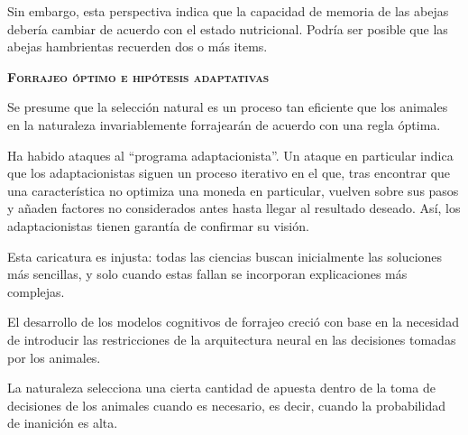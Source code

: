 \documentclass[a4paper,12pt]{article}
\begin{document}
Sin embargo, esta perspectiva indica que la capacidad de memoria de las abejas debería cambiar de acuerdo con el estado nutricional. Podría ser posible que las abejas hambrientas recuerden dos o más items.

{\scshape\bfseries Forrajeo óptimo e hipótesis adaptativas}

Se presume que la selección natural es un proceso tan eficiente que los animales en la naturaleza invariablemente forrajearán de acuerdo con una regla óptima.

Ha habido ataques al ``programa adaptacionista''. Un ataque en particular indica que los adaptacionistas siguen un proceso iterativo en el que, tras encontrar que una característica no optimiza una moneda en particular, vuelven sobre sus pasos y añaden factores no considerados antes hasta llegar al resultado deseado. Así, los adaptacionistas tienen garantía de confirmar su visión.

Esta caricatura es injusta: todas las ciencias buscan inicialmente las soluciones más sencillas, y solo cuando estas fallan se incorporan explicaciones más complejas.

El desarrollo de los modelos cognitivos de forrajeo creció con base en la necesidad de introducir las restricciones de la arquitectura neural en las decisiones tomadas por los animales.

La naturaleza selecciona una cierta cantidad de apuesta dentro de la toma de decisiones de los animales cuando es necesario, es decir, cuando la probabilidad de inanición es alta.
\end{document}
